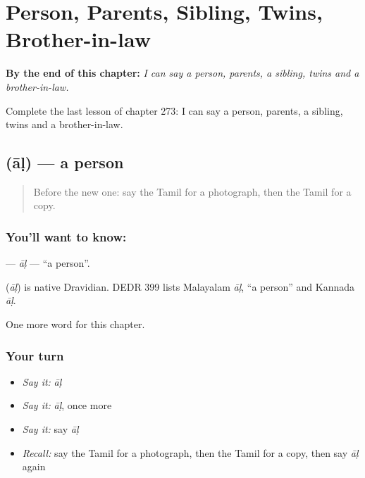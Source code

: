 
\chapter{Person, Parents, Sibling, Twins, Brother-in-law}
\label{ch:ta-person-parents-sibling-twins-brother-in-law}

\begin{chapteropening}
\textbf{By the end of this chapter:} \emph{I can say a person, parents, a sibling, twins and a brother-in-law.}

Complete the last lesson of chapter 273: I can say a person, parents, a sibling, twins and a brother-in-law.
\end{chapteropening}

\section[\texorpdfstring{\ta{ஆள்} (āḷ)}{ஆள் (āḷ)}]{ (āḷ) — a person}

\label{lesson:TA-C273-al}



\begin{quote}
Before the new one: say the Tamil for a photograph, then the Tamil for a copy.
\end{quote}

\subsection*{You'll want to know: }
\textbf{} — \emph{āḷ} — \textquotedblleft{}a person\textquotedblright{}.

\begin{cousinweb}
\textbf{} (\emph{āḷ}) is native Dravidian. DEDR 399 lists Malayalam \emph{āḷ}, \textquotedblleft{}a person\textquotedblright{} and Kannada \emph{āḷ}.
\end{cousinweb}

\begin{grammarlens}[title={What you've built}]
One more word for this chapter.
\end{grammarlens}

\subsection*{Your turn}
\begin{itemize}
\raggedright
  \item \emph{Say it:} \emph{āḷ}
  \item \emph{Say it:} \emph{āḷ}, once more
  \item \emph{Say it:} say \emph{āḷ}
  \item \emph{Recall:} say the Tamil for a photograph, then the Tamil for a copy, then say \emph{āḷ} again
\end{itemize}

